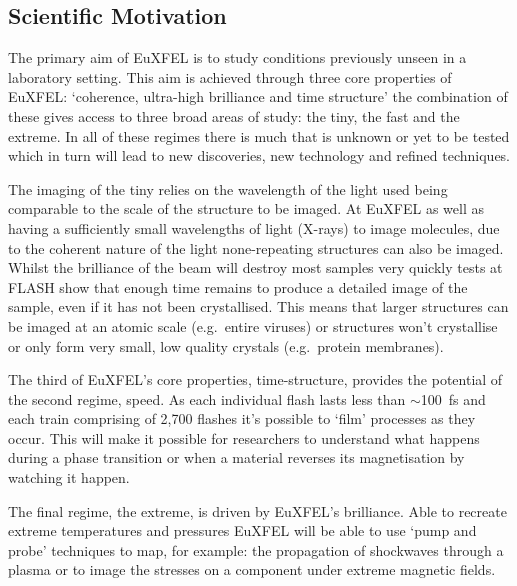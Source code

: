 \subsection{Scientific Motivation} %
\label{sub:scientific_motivation}
The primary aim of EuXFEL is to study conditions previously unseen in a laboratory setting. This aim is achieved through three core properties of EuXFEL: `coherence, ultra-high brilliance and time structure' \cite{CITEATION FOR THE TDR} the combination of these gives access to three broad areas of study: the tiny, the fast and the extreme. In all of these regimes there is much that is unknown or yet to be tested which in turn will lead to new discoveries, new technology and refined techniques.

The imaging of the tiny relies on the wavelength of the light used being comparable to the scale of the structure to be imaged. At EuXFEL as well as having a sufficiently small wavelengths of light (X-rays) to image molecules, due to the coherent nature of the light none-repeating structures can also be imaged. Whilst the brilliance of the beam will destroy most samples very quickly tests at FLASH show that enough time remains to produce a detailed image of the sample, even if it has not been crystallised. This means that larger structures can be imaged at an atomic scale (e.g.\ entire viruses) or structures won't crystallise or only form very small, low quality crystals (e.g.\ protein membranes).

The third of EuXFEL's core properties, time-structure, provides the potential of the second regime, speed. As each individual flash lasts less than \( \sim \)100~fs and each train comprising of 2,700 flashes it's possible to `film' processes as they occur. This will make it possible for researchers to understand what happens during a phase transition or when a material reverses its magnetisation by watching it happen.

The final regime, the extreme, is driven by EuXFEL's brilliance. Able to recreate extreme temperatures and pressures EuXFEL will be able to use `pump and probe' techniques to map, for example: the propagation of shockwaves through a plasma or to image the stresses on a component under extreme magnetic fields.

